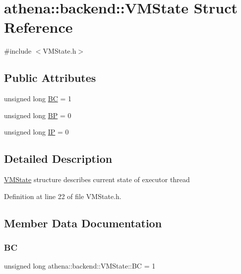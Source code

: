 \hypertarget{structathena_1_1backend_1_1_v_m_state}{}\section{athena\+:\+:backend\+:\+:V\+M\+State Struct Reference}
\label{structathena_1_1backend_1_1_v_m_state}


{\ttfamily \#include $<$V\+M\+State.\+h$>$}

\subsection*{Public Attributes}
\begin{DoxyCompactItemize}
\item 
unsigned long \mbox{\hyperlink{structathena_1_1backend_1_1_v_m_state_a98d980bfeb4402173c13eaa96408d381}{BC}} = 1
\item 
unsigned long \mbox{\hyperlink{structathena_1_1backend_1_1_v_m_state_a1fb11ee3d01bf657152300143ba4cc46}{BP}} = 0
\item 
unsigned long \mbox{\hyperlink{structathena_1_1backend_1_1_v_m_state_a1da90c7b0a431dd55ca1845338a04d81}{IP}} = 0
\end{DoxyCompactItemize}


\subsection{Detailed Description}
\mbox{\hyperlink{structathena_1_1backend_1_1_v_m_state}{V\+M\+State}} structure describes current state of executor thread 

Definition at line 22 of file V\+M\+State.\+h.



\subsection{Member Data Documentation}
\mbox{\label{structathena_1_1backend_1_1_v_m_state_a98d980bfeb4402173c13eaa96408d381}} 
\subsubsection{\texorpdfstring{BC}{BC}}
{\footnotesize\ttfamily unsigned long athena\+::backend\+::\+V\+M\+State\+::\+BC = 1}

